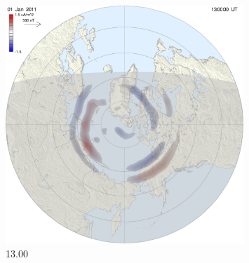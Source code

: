 \begin{figure}[ht!]
\begin{minipage}{0.33\textwidth}
\includegraphics[width=0.8\textwidth]{Figures/Ampere/1293886800north.pdf}
\caption{13.00}
\end{minipage}


\end{figure}
